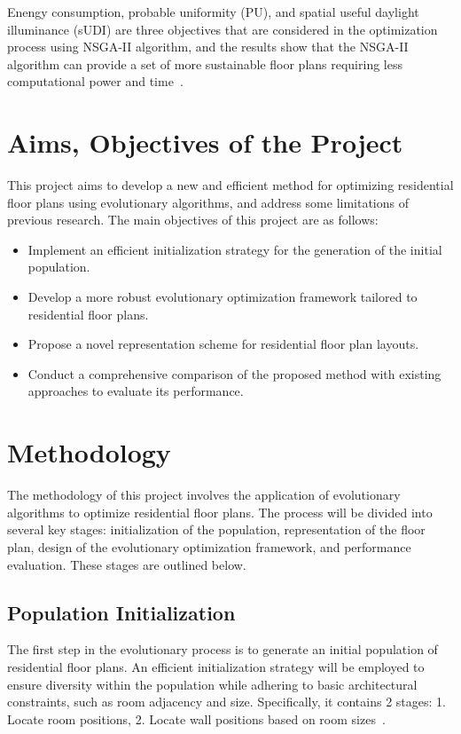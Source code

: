 \documentclass[]{article}
\begin{document}
Enengy consumption, probable uniformity (PU), and spatial useful daylight illuminance (sUDI) are three objectives that are considered in the optimization process using NSGA-II algorithm, and the results show that the NSGA-II algorithm can provide a set of more sustainable floor plans requiring less computational power and time~\cite{CHAICHI2024108842}.

\section{Aims, Objectives of the Project}
This project aims to develop a new and efficient method for optimizing residential floor plans using evolutionary algorithms, and address some limitations of previous research.
The main objectives of this project are as follows: 
\begin{itemize}
    \item Implement an efficient initialization strategy for the generation of the initial population.
    \item Develop a more robust evolutionary optimization framework tailored to residential floor plans.
    \item Propose a novel representation scheme for residential floor plan layouts.
    \item Conduct a comprehensive comparison of the proposed method with existing approaches to evaluate its performance.
\end{itemize}

\section{Methodology}
The methodology of this project involves the application of evolutionary algorithms to optimize residential floor plans. The process will be divided into several key stages: initialization of the population, representation of the floor plan, design of the evolutionary optimization framework, and performance evaluation. These stages are outlined below.

\subsection{Population Initialization}
The first step in the evolutionary process is to generate an initial population of residential floor plans. An efficient initialization strategy will be employed to ensure diversity within the population while adhering to basic architectural constraints, such as room adjacency and size. Specifically, it contains 2 stages: 1. Locate room positions, 2. Locate wall positions based on room sizes~\cite{10.1145/3355089.3356556}.
\end{document}
